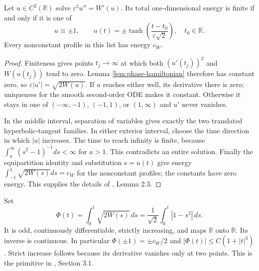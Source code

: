 \begin{theorem}\label{thm:phase-ode-classification}
Let $u\in C^2(\mathbb R)$ solve $\varepsilon^2u''=W'(u)$. Its total one-dimensional energy is finite if and only if it is one of
\[
 u\equiv\pm1,\qquad
 u(t)=\pm\tanh\left(\frac{t-t_0}{\varepsilon\sqrt2}\right),
 \quad t_0\in\mathbb R.
\]
Every nonconstant profile in this list has energy $c_W$.
\end{theorem}
\begin{proof}
Finiteness gives points $t_j\to\infty$ at which both $(u'(t_j))^2$ and $W(u(t_j))$ tend to zero. Lemma \ref{lem:phase-hamiltonian} therefore has constant zero, so $\varepsilon|u'|=\sqrt{2W(u)}$. If $u$ reaches either well, its derivative there is zero; uniqueness for the smooth second-order ODE makes it constant. Otherwise it stays in one of $(-\infty,-1)$, $(-1,1)$, or $(1,\infty)$ and $u'$ never vanishes.

In the middle interval, separation of variables gives exactly the two translated hyperbolic-tangent families. In either exterior interval, choose the time direction in which $|u|$ increases. The time to reach infinity is finite, because $\int_a^\infty(s^2-1)^{-1}ds<\infty$ for $a>1$. This contradicts an entire solution. Finally the equipartition identity and substitution $s=u(t)$ give energy $\int_{-1}^1\sqrt{2W(s)}ds=c_W$ for the nonconstant profiles; the constants have zero energy. This supplies the details of \cite{ChAC}, Lemma 2.3.
\end{proof}

\begin{definition}\label{def:phase-primitive}
Set
\[
 \Phi(t)=\int_0^t\sqrt{2W(s)}\,ds
        =\frac1{\sqrt2}\int_0^t|1-s^2|\,ds.
\]
It is odd, continuously differentiable, strictly increasing, and maps $\mathbb R$ onto $\mathbb R$. Its inverse is continuous. In particular $\Phi(\pm1)=\pm c_W/2$ and $|\Phi(t)|\leq C(1+|t|^3)$. Strict increase follows because its derivative vanishes only at two points. This is the primitive in \cite{ChAC}, Section 3.1.
\end{definition}

